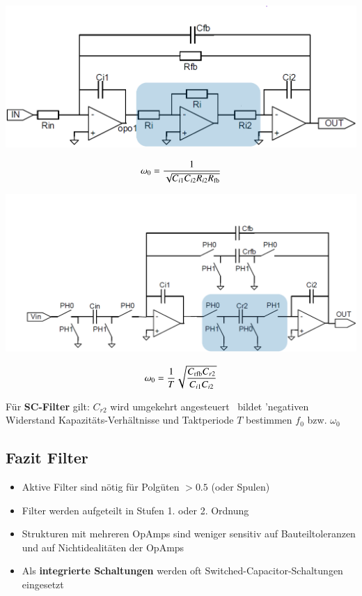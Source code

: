 \begin{minipage}[t]{0.48\columnwidth}
    \begin{center}
        \includegraphics[width=\columnwidth]{images/rc_filter.png}
    \end{center}
    $$ \omega_0 = \frac{1}{\sqrt{C_{i1} C_{i2} R_{i2} R_{\rm fb}}} $$
\end{minipage}
\hfill
\begin{minipage}[t]{0.48\columnwidth}
    \begin{center}
        \includegraphics[width=\columnwidth]{images/sc_filter.png}
    \end{center}

    $$ \omega_0 =  \frac{1}{T} \sqrt{ \frac{C_{\rm rfb} C_{r2}}{ C_{i1} C_{i2}} } $$
\end{minipage}

\begin{outline}
    \1 Für \textbf{SC-Filter} gilt:
        \2 $C_{r2}$ wird umgekehrt angesteuert \textrightarrow\ bildet 'negativen Widerstand
        \2 Kapazitäts-Verhältnisse und Taktperiode $T$ bestimmen $f_0$ bzw. $\omega_0$
\end{outline}

\subsection{Fazit Filter}

\begin{itemize}
    \item Aktive Filter sind nötig für Polgüten $> 0.5$ (oder Spulen)
    \item Filter werden aufgeteilt in Stufen 1. oder 2. Ordnung
    \item Strukturen mit mehreren OpAmps sind weniger sensitiv auf Bauteiltoleranzen und auf Nichtidealitäten der OpAmps
    \item Als \textbf{integrierte Schaltungen} werden oft Switched-Capacitor-Schaltungen eingesetzt
\end{itemize}

